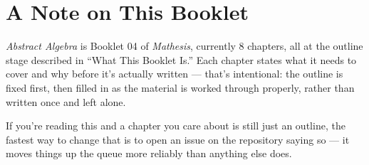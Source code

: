 \chapter*{A Note on This Booklet}

\textit{Abstract Algebra} is Booklet 04 of \textit{Mathesis}, currently 8 chapters, all at the outline stage described in ``What This Booklet Is.'' Each chapter states what it needs to cover and why before it's actually written --- that's intentional: the outline is fixed first, then filled in as the material is worked through properly, rather than written once and left alone.

If you're reading this and a chapter you care about is still just an outline, the fastest way to change that is to open an issue on the repository saying so --- it moves things up the queue more reliably than anything else does.
